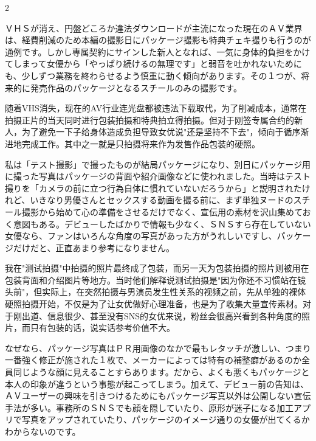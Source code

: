 \documentclass[12pt,UTF8]{ctexbook}
\begin{document}
\begin{paracol}{2}

ＶＨＳが消え、円盤どころか違法ダウンロードが主流になった現在のＡＶ業界は、経費削減のため本編の撮影日にパッケージ撮影も特典チェキ撮りも行うのが通例です。しかし専属契約にサインした新人となれば、一気に身体的負担をかけてしまって女優から「やっぱり続けるの無理です」と弱音を吐かれないためにも、少しずつ業務を終わらせるよう慎重に動く傾向があります。その１つが、将来的に発売作品のパッケージとなるスチールのみの撮影です。

\switchcolumn

随着VHS消失，现在的AV行业连光盘都被违法下载取代，为了削减成本，通常在拍摄正片的当天同时进行包装拍摄和特典拍立得拍摄。但对于刚签专属合约的新人，为了避免一下子给身体造成负担导致女优说"还是坚持不下去"，倾向于循序渐进地完成工作。其中之一就是只拍摄将来作为发售作品包装的硬照。

\switchcolumn*

私は「テスト撮影」で撮ったものが結局パッケージになり、別日にパッケージ用に撮った写真はパッケージの背面や紹介画像などに使われました。当時はテスト撮りを「カメラの前に立つ行為自体に慣れていないだろうから」と説明されたけれど、いきなり男優さんとセックスする動画を撮る前に、まず単独ヌードのスチール撮影から始めて心の準備をさせるだけでなく、宣伝用の素材を沢山集めておく意図もある。デビューしたばかりで情報も少なく、ＳＮＳすら存在していない女優なら、ファンはいろんな角度の写真があった方がうれしいですし、パッケージだけだと、正直あまり参考になりません。

\switchcolumn

我在"测试拍摄"中拍摄的照片最终成了包装，而另一天为包装拍摄的照片则被用在包装背面和介绍图片等地方。当时他们解释说测试拍摄是"因为你还不习惯站在镜头前"，但实际上，在突然拍摄与男演员发生性关系的视频之前，先从单独的裸体硬照拍摄开始，不仅是为了让女优做好心理准备，也是为了收集大量宣传素材。对于刚出道、信息很少、甚至没有SNS的女优来说，粉丝会很高兴看到各种角度的照片，而只有包装的话，说实话参考价值不大。

\switchcolumn*

なぜなら、パッケージ写真はＰＲ用画像のなかで最もレタッチが激しい、つまり一番強く修正が施された１枚で、メーカーによっては特有の補整癖があるのか全員同じような顔に見えることすらあります。だから、よくも悪くもパッケージと本人の印象が違うという事態が起こってしまう。加えて、デビュー前の告知は、ＡＶユーザーの興味を引きつけるためにもパッケージ写真以外は公開しない宣伝手法が多い。事務所のＳＮＳでも顔を隠していたり、原形が迷子になる加工アプリで写真をアップされていたり、パッケージのイメージ通りの女優が出てくるかわからないのです。


\end{paracol}
\end{document}
